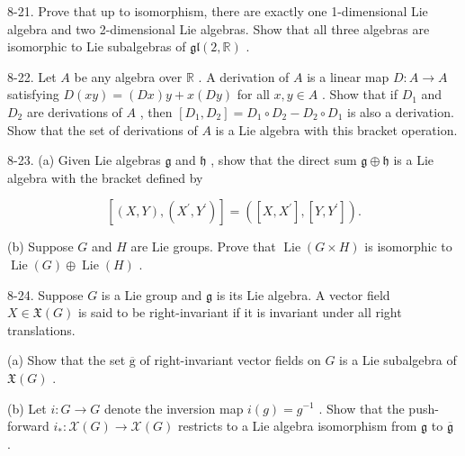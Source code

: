 \begin{exercise}
\label{prob:8-21}


8-21. Prove that up to isomorphism, there are exactly one 1-dimensional Lie algebra and two 2-dimensional Lie algebras. Show that all three algebras are isomorphic to Lie subalgebras of $\mathfrak{{gl}}\left( {2,\mathbb{R}}\right)$ .
\end{exercise}

\begin{exercise}
\label{prob:8-22}


8-22. Let $A$ be any algebra over $\mathbb{R}$ . A derivation of $A$ is a linear map $D : A \rightarrow  A$ satisfying $D\left( {xy}\right)  = \left( {Dx}\right) y + x\left( {Dy}\right)$ for all $x, y \in  A$ . Show that if ${D}_{1}$ and ${D}_{2}$ are derivations of $A$ , then $\left\lbrack  {{D}_{1},{D}_{2}}\right\rbrack   = {D}_{1} \circ  {D}_{2} - {D}_{2} \circ  {D}_{1}$ is also a derivation. Show that the set of derivations of $A$ is a Lie algebra with this bracket operation.
\end{exercise}

\begin{exercise}
\label{prob:8-23}


8-23. (a) Given Lie algebras $\mathfrak{g}$ and $\mathfrak{h}$ , show that the direct sum $\mathfrak{g} \oplus  \mathfrak{h}$ is a Lie algebra with the bracket defined by

\[
\left\lbrack  {\left( {X, Y}\right) ,\left( {{X}^{\prime },{Y}^{\prime }}\right) }\right\rbrack   = \left( {\left\lbrack  {X,{X}^{\prime }}\right\rbrack  ,\left\lbrack  {Y,{Y}^{\prime }}\right\rbrack  }\right) .
\]

(b) Suppose $G$ and $H$ are Lie groups. Prove that $\operatorname{Lie}\left( {G \times  H}\right)$ is isomorphic to $\operatorname{Lie}\left( G\right)  \oplus  \operatorname{Lie}\left( H\right)$ .
\end{exercise}

\begin{exercise}
\label{prob:8-24}


8-24. Suppose $G$ is a Lie group and $\mathfrak{g}$ is its Lie algebra. A vector field $X \in  \mathfrak{X}\left( G\right)$ is said to be right-invariant if it is invariant under all right translations.

(a) Show that the set $\overline{\mathrm{g}}$ of right-invariant vector fields on $G$ is a Lie subalgebra of $\mathfrak{X}\left( G\right)$ .

(b) Let $i : G \rightarrow  G$ denote the inversion map $i\left( g\right)  = {g}^{-1}$ . Show that the push-forward ${i}_{ * } : \mathcal{X}\left( G\right)  \rightarrow  \mathcal{X}\left( G\right)$ restricts to a Lie algebra isomorphism from $\mathfrak{g}$ to $\overline{\mathfrak{g}}$ .
\end{exercise}

